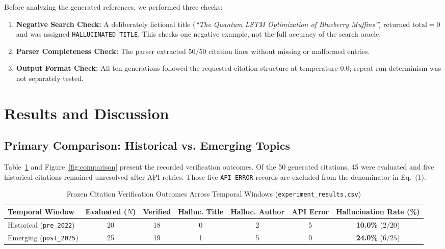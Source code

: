 \documentclass[manuscript,screen]{acmart}
\begin{document}
Before analyzing the generated references, we performed three checks:
\begin{enumerate}
    \item \textbf{Negative Search Check:} A deliberately fictional title (\textit{``The Quantum LSTM Optimization of Blueberry Muffins''}) returned $\text{total} = 0$ and was assigned \texttt{HALLUCINATED\_TITLE}. This checks one negative example, not the full accuracy of the search oracle.
    \item \textbf{Parser Completeness Check:} The parser extracted $50/50$ citation lines without missing or malformed entries.
    \item \textbf{Output Format Check:} All ten generations followed the requested citation structure at temperature $0.0$; repeat-run determinism was not separately tested.
\end{enumerate}

\section{Results and Discussion}

\subsection{Primary Comparison: Historical vs. Emerging Topics}
Table~\ref{tab:results} and Figure~\ref{fig:comparison} present the recorded verification outcomes. Of the 50 generated citations, 45 were evaluated and five historical citations remained unresolved after API retries. Those five \texttt{API\_ERROR} records are excluded from the denominator in Eq.~(1).

\begin{table}[h]
\centering
\caption{Frozen Citation Verification Outcomes Across Temporal Windows (\texttt{experiment\_results.csv})}
\label{tab:results}
\begin{tabular}{@{}lcccccc@{}}
\toprule
\textbf{Temporal Window} & \textbf{Evaluated ($N$)} & \textbf{Verified} & \textbf{Halluc. Title} & \textbf{Halluc. Author} & \textbf{API Error} & \textbf{Hallucination Rate (\%)} \\ \midrule
Historical (\texttt{pre\_2022}) & 20 & 18 & 0 & 2 & 5 & \textbf{10.0\%} ($2/20$) \\
Emerging (\texttt{post\_2025}) & 25 & 19 & 1 & 5 & 0 & \textbf{24.0\%} ($6/25$) \\ \bottomrule
\end{tabular}
\end{table}
\end{document}
